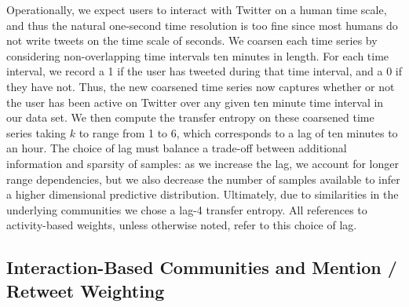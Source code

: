 Operationally, we expect users to interact with Twitter on a human time scale, and thus the natural one-second time resolution is too fine since most humans do not write tweets on the time scale of seconds. We coarsen each time series by considering non-overlapping time intervals ten minutes in length. For each time interval, we record a 1 if the user has tweeted during that time interval, and a 0 if they have not. Thus, the new coarsened time series now captures whether or not the user has been active on Twitter over any given ten minute time interval in our data set. We then compute the transfer entropy on these coarsened time series taking $k$ to range from 1 to 6, which corresponds to a lag of ten minutes to an hour. The choice of lag must balance a trade-off between additional information and sparsity of samples: as we increase the lag, we account for longer range dependencies, but we also decrease the number of samples available to infer a higher dimensional predictive distribution. Ultimately, due to similarities in the underlying communities we chose a lag-4 transfer entropy. All references to activity-based weights, unless otherwise noted, refer to this choice of lag.

\subsection{Interaction-Based Communities and Mention / Retweet Weighting}
\label{sec:method-interaction}

